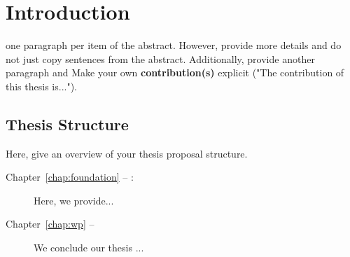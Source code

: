 
\chapter{Introduction}
one paragraph per item of the abstract. However, provide more details and do not just copy sentences from the abstract. 
Additionally, provide  another paragraph and  Make your own \textbf{contribution(s)} explicit ("The contribution of this thesis is...").


\section*{Thesis Structure}
Here, give an overview of your thesis proposal structure.
\begin{description}
	\item[Chapter~\ref{chap:foundation} -- :] Here, we provide...
	\item[Chapter~\ref{chap:wp} -- ] We conclude our thesis ...
\end{description}






